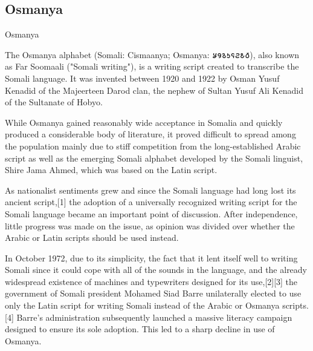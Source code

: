 \subsection{Osmanya}

\newfontfamily{}

\begin{scriptexample}[]{Osmanya}
\end{scriptexample}

The Osmanya alphabet (Somali: Cismaanya; Osmanya: {\osmanya 𐒋𐒘𐒈𐒑𐒛𐒒𐒕𐒀}), also known as Far Soomaali ("Somali writing"), is a writing script created to transcribe the Somali language. It was invented between 1920 and 1922 by Osman Yusuf Kenadid of the Majeerteen Darod clan, the nephew of Sultan Yusuf Ali Kenadid of the Sultanate of Hobyo.

While Osmanya gained reasonably wide acceptance in Somalia and quickly produced a considerable body of literature, it proved difficult to spread among the population mainly due to stiff competition from the long-established Arabic script as well as the emerging Somali alphabet developed by the Somali linguist, Shire Jama Ahmed, which was based on the Latin script.

As nationalist sentiments grew and since the Somali language had long lost its ancient script,[1] the adoption of a universally recognized writing script for the Somali language became an important point of discussion. After independence, little progress was made on the issue, as opinion was divided over whether the Arabic or Latin scripts should be used instead.

In October 1972, due to its simplicity, the fact that it lent itself well to writing Somali since it could cope with all of the sounds in the language, and the already widespread existence of machines and typewriters designed for its use,[2][3] the government of Somali president Mohamed Siad Barre unilaterally elected to use only the Latin script for writing Somali instead of the Arabic or Osmanya scripts.[4] Barre's administration subsequently launched a massive literacy campaign designed to ensure its sole adoption. This led to a sharp decline in use of Osmanya.